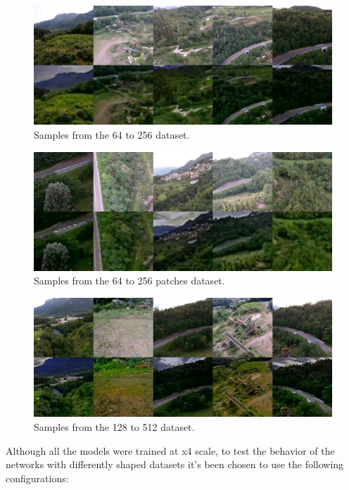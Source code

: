 \begin{figure}[H]
  \centering
  \includegraphics[scale=0.4]{figures/final_64_256.png}
  \caption{Samples from the 64 to 256 dataset.}
  \label{img:64_256}
\end{figure}

\begin{figure}[H]
  \centering
  \includegraphics[scale=0.4]{figures/final_64_256_patches.png}
  \caption{Samples from the 64 to 256 patches dataset.}
  \label{img:64_256_p}
\end{figure}

\begin{figure}[H]
  \centering
  \includegraphics[scale=0.4]{figures/final_128_512.png}
  \caption{Samples from the 128 to 512 dataset.}
  \label{img:128_512}
\end{figure}


Although all the models were trained at x4 scale, to test the behavior of the networks with differently shaped datasets it's been chosen to use the following configurations:

